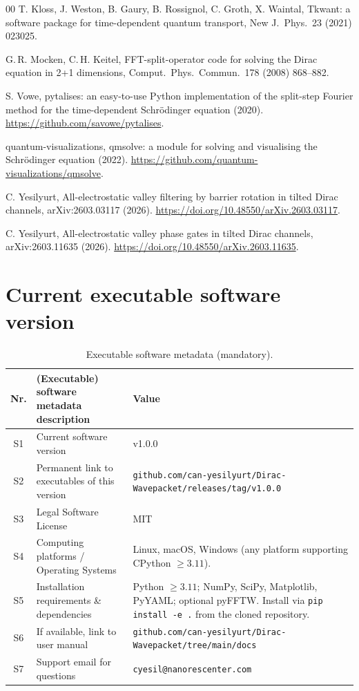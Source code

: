 \documentclass[preprint, 12pt, a4paper]{elsarticle}
\begin{document}
\begin{thebibliography}{00}
T. Kloss, J. Weston, B. Gaury, B. Rossignol, C. Groth, X. Waintal,
Tkwant: a software package for time-dependent quantum transport,
New J.\ Phys.\ 23 (2021) 023025.

G.\,R. Mocken, C.\,H. Keitel, FFT-split-operator code for solving
the Dirac equation in 2+1 dimensions, Comput.\ Phys.\ Commun.\ 178
(2008) 868--882.

S. Vowe, pytalises: an easy-to-use Python implementation of the
split-step Fourier method for the time-dependent Schr\"odinger
equation (2020). \url{https://github.com/savowe/pytalises}.

quantum-visualizations, qmsolve: a module for solving and
visualising the Schr\"odinger equation (2022).
\url{https://github.com/quantum-visualizations/qmsolve}.

C. Yesilyurt, All-electrostatic valley filtering by barrier rotation
in tilted Dirac channels, arXiv:2603.03117 (2026).
\url{https://doi.org/10.48550/arXiv.2603.03117}.

C. Yesilyurt, All-electrostatic valley phase gates in tilted Dirac
channels, arXiv:2603.11635 (2026).
\url{https://doi.org/10.48550/arXiv.2603.11635}.

\end{thebibliography}

\section*{Current executable software version}
\label{}

\begin{table}[!h]
\small
\begin{tabular}{|c|p{4.8cm}|p{6.8cm}|}
\hline
\textbf{Nr.} & \textbf{(Executable) software metadata description} &
              \textbf{Value} \\
\hline
S1 & Current software version & v1.0.0 \\
\hline
S2 & Permanent link to executables of this version &
    \nolinkurl{github.com/can-yesilyurt/Dirac-Wavepacket/releases/tag/v1.0.0} \\
\hline
S3 & Legal Software License & MIT \\
\hline
S4 & Computing platforms / Operating Systems &
    Linux, macOS, Windows (any platform supporting CPython $\geq 3.11$). \\
\hline
S5 & Installation requirements \& dependencies &
    Python $\geq 3.11$; NumPy, SciPy, Matplotlib, PyYAML;
    optional pyFFTW. Install via \texttt{pip install -e .}
    from the cloned repository. \\
\hline
S6 & If available, link to user manual &
    \nolinkurl{github.com/can-yesilyurt/Dirac-Wavepacket/tree/main/docs} \\
\hline
S7 & Support email for questions & \texttt{cyesil@nanorescenter.com} \\
\hline
\end{tabular}
\caption{Executable software metadata (mandatory).}
\label{tab:meta-exe}
\end{table}
\end{document}
